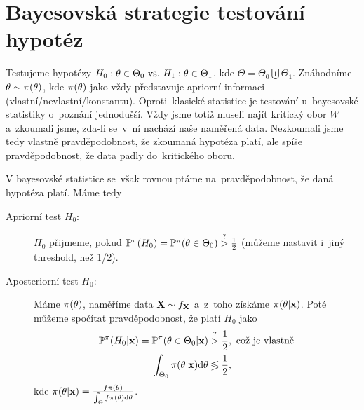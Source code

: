 \chapter{Bayesovská strategie testování hypotéz}
Testujeme hypotézy $H_0: \theta\in\Theta_0 ~\text{vs.}~ H_1: \theta\in\Theta_1$, kde $\Theta
=\Theta_0 \biguplus \Theta_1$. Znáhodníme $\theta\sim\pi(\theta)$, kde $\pi(\theta)$ jako vždy představuje apriorní informaci (vlastní/nevlastní/konstantu). Oproti~klasické statistice je testování u~bayesovské statistiky o~poznání jednodušší. Vždy jsme totiž museli najít kritický obor $W$ a~zkoumali jsme, zda-li se~v~ní nachází naše naměřená data. Nezkoumali jsme tedy vlastně pravděpodobnost, že zkoumaná hypotéza platí, ale spíše pravděpodobnost, že data padly do~kritického oboru. 

V bayesovské statistice se~však rovnou ptáme na~pravděpodobnost, že daná hypotéza platí. Máme tedy
\begin{description}
	\item[Apriorní test $H_0$:] $H_0$ přijmeme, pokud $\mathbb{P}^\pi(H_0)=\mathbb{P}^\pi(\theta\in\Theta_0)\stackrel{?}{>}\frac{1}{2}$ (můžeme nastavit i~jiný threshold, než 1/2).
	\item[Aposteriorní test $H_0$:] Máme $\pi(\theta)$, naměříme data $\textbf{X}\sim f_{\textbf{X}}$ a~z~toho získáme $\pi(\theta|\textbf{x})$. Poté můžeme spočítat pravděpodobnost, že platí $H_0$ jako
	\[
	\begin{split}
	\mathbb{P}^\pi(H_0|\textbf{x})=\mathbb{P}^\pi(\theta\in\Theta_0|\textbf{x})&\stackrel{?}{>}\frac{1}{2}, \text{ což je vlastně}\\
	\int_{\Theta_0}\pi(\theta|\textbf{x})\mathrm{d}\theta & \lessgtr \frac{1}{2},
	\end{split}
	\]
	kde $\pi(\theta|\textbf{x})= \frac{f\pi(\theta)}{\int_\Theta f\pi(\theta)\mathrm{d}\theta}$.
\end{description}


